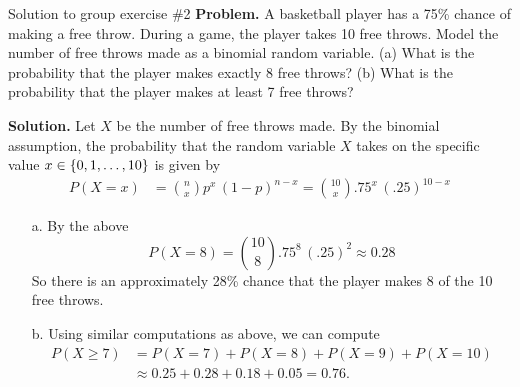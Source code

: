\documentclass[10pt]{beamer}
\begin{document}
\begin{frame}{Solution to group exercise \#2}
\footnotesize 
\textbf{Problem.} 	A basketball player has a 75\% chance of making a free throw. During a game, the player takes 10 free throws. Model the number of free throws made as a binomial random variable.  (a) What is the probability that the player makes exactly 8 free throws? (b) What is the probability that the player makes at least 7 free throws?
\vfill 

\small 
\textbf{Solution.} 
Let $X$ be the number of free throws made.  By the binomial assumption, the probability that the random variable $X$ takes on the specific value $x \in \{ {0,1,\hdots, 10} \}$ is given by
%
\begin{align*}
P(X=x) &= \binom{n}{x} p^x \, (1-p)^{n-x} = \binom{10}{x} .75^x \, (.25)^{10-x} 
\end{align*}
%
\vspace{-.2cm}
\begin{itemize}\small   
	\item[a.] By the above
	\[P(X=8) = \binom{10}{8} .75^8\, (.25)^{2} \approx 0.28 \]
	So there is an approximately 28\% chance that the player makes 8 of the 10 free throws.
	\item[b.] Using similar computations as above, we can compute
	\begin{align*}
	P(X \geq 7) &= P(X=7) + P(X=8) + P(X=9) + P(X=10) \\
	& \approx 0.25 + 0.28 + 0.18 + 0.05 = 0.76.
	\end{align*}
	\end{itemize}
		
\vfill 
\end{frame}
\end{document}

